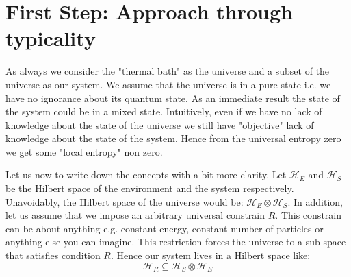 \documentclass[a4paper,12pt]{article}
\begin{document}
\section{First Step: Approach through typicality}
As always we consider the "thermal bath" as the universe and a subset of the universe as our system. We assume that the universe is in a pure state i.e. we have no ignorance about its quantum state. As an immediate result the state of the system could be in a mixed state. Intuitively, even if we have no lack of knowledge about the state of the universe we still have "objective" lack of knowledge about the state of the system. Hence from the universal entropy zero we get some "local entropy" non zero. \par
Let us now to write down the concepts with a bit more clarity. Let $\mathcal{H}_{E}$ and $\mathcal{H}_{S}$ 
be the Hilbert space of the environment and the system respectively. Unavoidably, the Hilbert space of the universe would be: $\mathcal{H}_{E}\otimes \mathcal{H}_{S}$. In addition, let us assume that we impose an arbitrary universal constrain $R$. This constrain can be about anything e.g. constant energy, constant number of particles or anything else you can imagine. This restriction forces the universe to a sub-space that satisfies condition $R$. Hence our system lives in a Hilbert space like:
\begin{equation}\mathcal{H}_{R} \subseteq \mathcal{H}_{S} \otimes \mathcal{H}_{E}
\end{equation}
\end{document}

